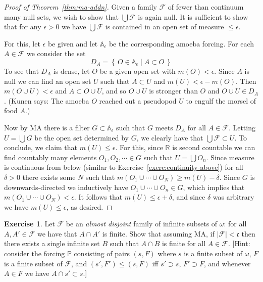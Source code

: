 \documentclass[11pt,oneside,a4paper]{amsbook}
\newcommand{\set}[1]{\left\{\,#1\,\right\}}
\newcommand{\PP}{\mathbb P}
\theoremstyle{definition}
\newtheorem{exercise}{Exercise}[section]
\theoremstyle{plain}
\theoremstyle{definition}
\theoremstyle{remark}
\numberwithin{equation}{section}
\numberwithin{figure}{section}
\begin{document}
\begin{proof}[Proof of Theorem~\ref{thm:ma-addn}]
  Given a family $\mathcal F$ of fewer than continuum many null sets, we wish to show that $\bigcup\mathcal F$ is again null. It is sufficient to show that for any $\epsilon>0$ we have $\bigcup\mathcal F$ is contained in an open set of measure $\leq\epsilon$.

  For this, let $\epsilon$ be given and let $\mathbb A_\epsilon$ be the corresponding amoeba forcing. For each $A\in\mathcal F$ we consider the set
  \[D_A=\set{O\in\mathbb A_\epsilon\mid A\subset O}
  \]
  To see that $D_A$ is dense, let $O$ be a given open set with $m(O)<\epsilon$. Since $A$ is null we can find an open set $U$ such that $A\subset U$ and $m(U)<\epsilon-m(O)$. Then $m(O\cup U)<\epsilon$ and $A\subset O\cup U$, and so $O\cup U$ is stronger than $O$ and $O\cup U\in D_A$. (Kunen says: The amoeba $O$ reached out a pseudopod $U$ to engulf the morsel of food $A$.)

  Now by MA there is a filter $G\subset\mathbb A_\epsilon$ such that $G$ meets $D_A$ for all $A\in\mathcal F$. Letting $U=\bigcup G$ be the open set determined by $G$, we clearly have that $\bigcup\mathcal F\subset U$. To conclude, we claim that $m(U)\leq\epsilon$. For this, since $\mathbb R$ is second countable we can find countably many elements $O_1,O_2,\cdots\in G$ such that $U=\bigcup O_n$. Since measure is continuous from below (similar to Exercise~\ref{exerc:continuity-above}) for all $\delta>0$ there exists some $N$ such that $m(O_1\cup\cdots\cup O_N)\geq m(U)-\delta$. Since $G$ is downwards-directed we inductively have $O_1\cup\cdots\cup O_n\in G$, which implies that $m(O_1\cup\cdots\cup O_N)<\epsilon$. It follows that $m(U)\leq\epsilon+\delta$, and since $\delta$ was arbitrary we have $m(U)\leq\epsilon$, as desired.
\end{proof}

\begin{exercise}
  Let $\mathcal F$ be an \emph{almost disjoint} family of infinite subsets of $\omega$: for all $A,A'\in\mathcal F$ we have that $A\cap A'$ is finite. Show that assuming MA, if $|\mathcal F|<\mathfrak c$ then there exists a single infinite set $B$ such that $A\cap B$ is finite for all $A\in\mathcal F$. [Hint: consider the forcing $\PP$ consisting of pairs $(s,F)$ where $s$ is a finite subset of $\omega$, $F$ is a finite subset of $\mathcal F$, and $(s',F')\leq(s,F)$ iff $s'\supset s$, $F'\supset F$, and whenever $A\in F$ we have $A\cap s'\subset s$.]
\end{exercise}
\end{document}
